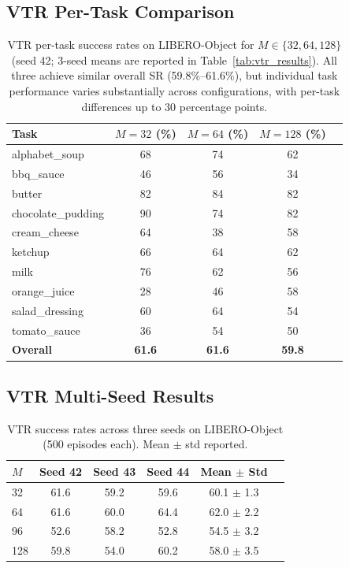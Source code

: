 \subsection{VTR Per-Task Comparison}

\begin{table}[ht]
\centering
\small
\caption{VTR per-task success rates on LIBERO-Object for $M \in \{32, 64, 128\}$ (seed 42; 3-seed means are reported in Table~\ref{tab:vtr_results}). All three achieve similar overall SR (59.8\%--61.6\%), but individual task performance varies substantially across configurations, with per-task differences up to 30 percentage points.}
\label{tab:smart_compress_pertask}
\begin{tabular}{lcccc}
\toprule
Task & $M{=}32$ (\%) & $M{=}64$ (\%) & $M{=}128$ (\%) \\
\midrule
alphabet\_soup & 68 & 74 & 62 \\
bbq\_sauce & 46 & 56 & 34 \\
butter & 82 & 84 & 82 \\
chocolate\_pudding & 90 & 74 & 82 \\
cream\_cheese & 64 & 38 & 58 \\
ketchup & 66 & 64 & 62 \\
milk & 76 & 62 & 56 \\
orange\_juice & 28 & 46 & 58 \\
salad\_dressing & 60 & 64 & 54 \\
tomato\_sauce & 36 & 54 & 50 \\
\midrule
\textbf{Overall} & \textbf{61.6} & \textbf{61.6} & \textbf{59.8} \\
\bottomrule
\end{tabular}
\end{table}

\subsection{VTR Multi-Seed Results}

\begin{table}[ht]
\centering
\small
\caption{VTR success rates across three seeds on LIBERO-Object (500 episodes each). Mean $\pm$ std reported.}
\label{tab:multi_seed}
\begin{tabular}{lccccr}
\toprule
$M$ & Seed 42 & Seed 43 & Seed 44 & Mean $\pm$ Std \\
\midrule
32 & 61.6 & 59.2 & 59.6 & 60.1 $\pm$ 1.3 \\
64 & 61.6 & 60.0 & 64.4 & 62.0 $\pm$ 2.2 \\
96 & 52.6 & 58.2 & 52.8 & 54.5 $\pm$ 3.2 \\
128 & 59.8 & 54.0 & 60.2 & 58.0 $\pm$ 3.5 \\
\bottomrule
\end{tabular}
\end{table}


